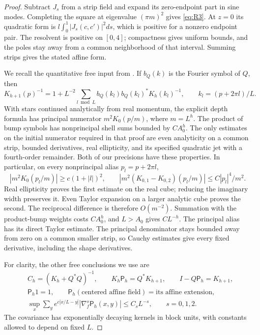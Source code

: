 \begin{proof}
Subtract $J_s$ from a strip field and expand its zero-endpoint part in
sine modes.  Completing the square at eigenvalue $(\pi m)^2$ gives
\eqref{eq:R3}.  At $z=0$ its quadratic form is
$l\int_0^1|J_s(c,c')|^2ds$, which is positive for a nonzero endpoint
pair.  The resolvent is positive on $[0,4]$; compactness gives uniform
bounds, and the poles stay away from a common neighborhood of that
interval.  Summing strips gives the stated affine form.

We recall the quantitative free input from
\cite[Section ``The linear block transformation'' and Appendix
``Uniform analytic estimates for the linear block map'', Lemmas
``Uniform shells and strips'' and ``Alias syzygy and coarse
division'']{SharpO4}.  If $b_Q(k)$ is the Fourier symbol of $Q$, then
\[
 K_{h+1}(p)^{-1}=1+L^{-2}\sum_{l\bmod L}
      b_Q(k_l)b_Q(k_l)^*K_h(k_l)^{-1},\qquad
 k_l=(p+2\pi l)/L.
\]
With stars continued analytically from real momentum, the explicit
depth formula has principal numerator $m^2K_0(p/m)$, where $m=L^h$.
The product of bump symbols has nonprincipal shell sums bounded by
$CA_0^h$.  The only estimates on the initial numerator required in
that proof are even analyticity on a common strip, bounded derivatives,
real ellipticity, and its specified quadratic jet with a fourth-order
remainder.  Both of our precisions have these properties.  In
particular, on every nonprincipal alias $p_l=p+2\pi l$,
\[
 |m^2K_0(p_l/m)|\ge c(1+|l|)^2,
 \qquad
 |m^2(K_{0,1}-K_{0,2})(p_l/m)|
                         \le C|p_l|^4/m^2.
\]
Real ellipticity proves the first estimate on the real cube; reducing
the imaginary width preserves it.  Even Taylor expansion on a larger
analytic cube proves the second.  The reciprocal difference is therefore
$O(m^{-2})$.  Summation with the product-bump weights costs
$CA_0^h$, and $L>A_0$ gives $CL^{-h}$.  The principal alias has its direct
Taylor estimate.  The principal denominator stays bounded away from
zero on a common smaller strip, so Cauchy estimates give every fixed
derivative, including the shape derivatives.

For clarity, the other free conclusions we use are
\begin{align}
 &C_h=(K_h+Q^*Q)^{-1},\qquad
 K_h\mathsf P_h=Q^*K_{h+1},\qquad I-Q\mathsf P_h=K_{h+1},
 \nonumber\\
 &\mathsf P_h1=1,\qquad
   \mathsf P_h(\text{centered affine field})
                         =\text{its affine extension},\nonumber\\
 &\sup_x\sum_y e^{c|x/L-y|}
   |\nabla_f^s\mathsf P_h(x,y)|\le C_sL^{-s},\qquad s=0,1,2.
 \label{eq:rg-free-prediction}
\end{align}
The covariance has exponentially decaying kernels in block units, with
constants allowed to depend on fixed $L$.


\end{proof}
